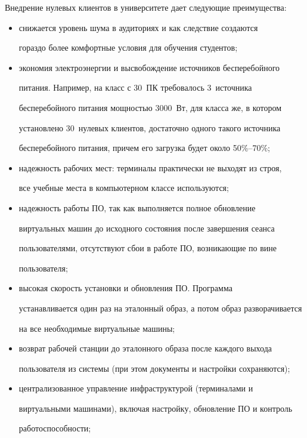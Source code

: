   Внедрение нулевых клиентов в университете дает следующие преимущества:

  \begin{itemize}

\item снижается уровень шума в аудиториях и как следствие создаются 

гораздо более комфортные условия для обучения студентов;

\item экономия электроэнергии и высвобождение источников бесперебойного 

питания. Например, на класс с 30~ПК требовалось 3~источника 

бесперебойного питания мощностью 3000~Вт, для класса же, в котором 

установлено 30~нулевых клиентов, достаточно одного такого источника 

бесперебойного питания, причем его загрузка будет около 50\%--70\%;

\item надежность рабочих мест: терминалы практически не выходят из строя, 

все учебные места в компьютерном классе используются;

\item надежность работы ПО, так как выполняется полное обновление 

виртуальных машин до исходного состояния после завершения сеанса 

пользователями, отсутствуют сбои в работе ПО, возникающие по вине 

пользователя;

\item высокая скорость установки и обновления ПО. Программа 

устанавливается один раз на эталонный образ, а потом образ разворачивается 

на все необходимые виртуальные машины;

\item возврат рабочей станции до эталонного образа после каждого выхода 

пользователя из системы (при этом документы и настройки сохраняются);

\item централизованное управление инфраструктурой (терминалами и 

виртуальными машинами), включая настройку, обновление ПО и контроль 

работоспособности;


\end{itemize}
